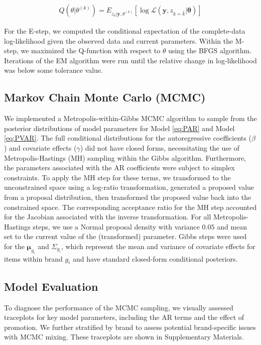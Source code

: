 \documentclass{article}
\begin{document}
\begin{align*}
    Q(\theta | \theta^{(k)}) = E_{z_k | \boldsymbol y, \theta^{(k)}} [\log \mathcal{L}(\boldsymbol y, z_{k = \hat k} | \boldsymbol{\theta})]
\end{align*}

\noindent For the E-step, we computed the conditional expectation of the complete-data log-likelihood given the observed data and current parameters. Within the M-step, we maximized the Q-function with respect to $\theta$ using the BFGS algorithm. Iterations of the EM algorithm were run until the relative change in log-likelihood was below some tolerance value.

\subsection{Markov Chain Monte Carlo (MCMC)}

\noindent We implemented a Metropolis-within-Gibbs MCMC algorithm to sample from the posterior distributions of model parameters for Model \ref{eq:PAR} and Model \ref{eq:PVAR}. The full conditional distributions for the autoregressive coefficients ($\beta$) and covariate effects ($\gamma$) did not have closed forms, necessitating the use of Metropolis-Hastings (MH) sampling within the Gibbs algorithm. Furthermore, the parameters associated with the AR coefficients were subject to simplex constraints. To apply the MH step for these terms, we transformed to the unconstrained space using a log-ratio transformation, generated a proposed value from a proposal distribution, then transformed the proposed value back into the constrained space. The corresponding acceptance ratio for the MH step accounted for the Jacobian associated with the inverse transformation. For all Metropolis-Hastings steps, we use a Normal proposal density with variance $0.05$ and mean set to the current value of the (transformed) parameter. Gibbs steps were used for the $\boldsymbol{\mu}_{g_i}$ and $\Sigma_{g_i}$, which represent the mean and variance of covariate effects for items within brand $g_i$ and have standard closed-form conditional posteriors.

\subsection{Model Evaluation}

\noindent To diagnose the performance of the MCMC sampling, we visually assessed traceplots for key model parameters, including the AR terms and the effect of promotion. We further stratified by brand to assess potential brand-specific issues with MCMC mixing. These traceplots are shown in Supplementary Materials. \\
\end{document}
